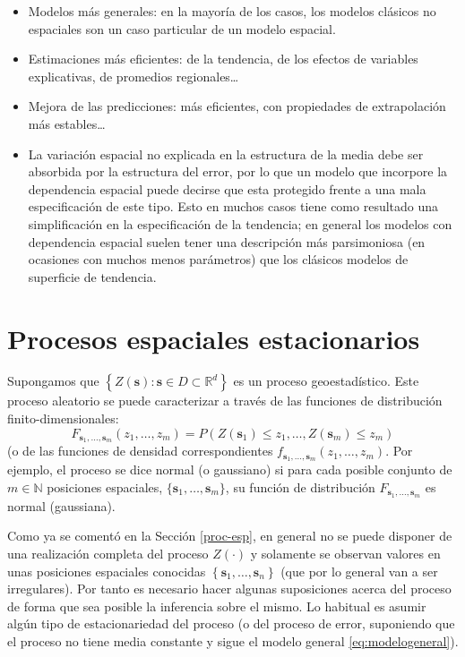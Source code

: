\documentclass[
  spanish,
]{book}
\theoremstyle{break}
\theoremstyle{definition}
\theoremstyle{definition}
\theoremstyle{definition}
\theoremstyle{definition}
\theoremstyle{remark}
\begin{document}
\begin{itemize}
\item
  Modelos más generales: en la mayoría de los casos, los modelos clásicos no espaciales son un caso particular de un modelo espacial.
\item
  Estimaciones más eficientes: de la tendencia, de los efectos de variables explicativas, de promedios regionales\ldots{}
\item
  Mejora de las predicciones: más eficientes, con propiedades de extrapolación más estables\ldots{}
\item
  La variación espacial no explicada en la estructura de la media debe ser absorbida por la estructura del error, por lo que un modelo que incorpore la dependencia espacial puede decirse que esta protegido frente a una mala especificación de este tipo. Esto en muchos casos tiene como resultado una simplificación en la especificación de la tendencia; en general los modelos con dependencia espacial suelen tener una descripción más parsimoniosa (en ocasiones con muchos menos parámetros) que los clásicos modelos de superficie de tendencia.
\end{itemize}

\hypertarget{procesos-estacionarios}{%
\section{Procesos espaciales estacionarios}\label{procesos-estacionarios}}

Supongamos que \(\left\{ Z(\mathbf{s}) : \mathbf{s} \in D \subset \mathbb{R}^{d} \right\}\) es un proceso geoestadístico.
Este proceso aleatorio se puede caracterizar a través de las funciones de distribución finito-dimensionales:
\[F_{\mathbf{s}_1, \ldots, \mathbf{s}_m}(z_1, \ldots, z_m)
= P\left(Z(\mathbf{s}_1)\leq z_1 , \ldots,Z(\mathbf{s}_m)\leq z_m \right)\]
(o de las funciones de densidad correspondientes \(f_{\mathbf{s}_1, \ldots, \mathbf{s}_m}(z_1, \ldots, z_m)\).
Por ejemplo, el proceso se dice normal (o gaussiano) si para cada posible conjunto de \(m \in \mathbb{N}\) posiciones espaciales, \(\{\mathbf{s}_1, \ldots, \mathbf{s}_m\}\), su función de distribución \(F_{\mathbf{s}_1, \ldots, \mathbf{s}_m}\) es normal (gaussiana).

Como ya se comentó en la Sección \ref{proc-esp}, en general no se puede disponer de una realización completa del proceso \(Z(\cdot)\) y solamente se observan valores en unas posiciones espaciales conocidas \(\left\{ \mathbf{s}_1, \ldots, \mathbf{s}_{n} \right\}\) (que por lo general van a ser irregulares).
Por tanto es necesario hacer algunas suposiciones acerca del proceso de forma que sea posible la inferencia sobre el mismo.
Lo habitual es asumir algún tipo de estacionariedad del proceso (o del proceso de error, suponiendo que el proceso no tiene media constante y sigue el modelo general \eqref{eq:modelogeneral}).
\end{document}
